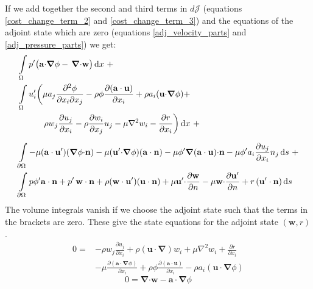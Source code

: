 \documentclass[12pt, a4paper]{article}
\begin{document}
    If we add together the second and third terms in $d \mathcal{J}$ (equations \ref{cost_change_term_2} and \ref{cost_change_term_3}) and the equations of the adjoint state which are zero (equations \ref{adj_velocity_parts} and \ref{adj_pressure_parts}) we get:
    \begin{equation} \label{cost_change_term_2345}
    \begin{split}
        &\int\limits_{\Omega} p' \big{(}
            \mathbf{a \cdot} \boldsymbol{\nabla} \phi -
            \, \boldsymbol{\nabla} \mathbf{\cdot w}
        \big{)} \, \mathrm{d}x \ + \\
        &\int\limits_{\Omega} u'_i \bigg{(}
            \mu a_j \frac{\partial^2 \phi}{\partial x_i \partial x_j}  - 
            \rho \phi \frac{\partial (\mathbf{a \cdot u})}{\partial x_i} +
            \rho a_i (\mathbf{u \cdot} \boldsymbol{\nabla} \phi) + \\
        & \phantom{\int\limits_{\Omega} u'_i \bigg{(} \ }
            \rho w_j \frac{\partial u_j}{\partial x_i} - 
            \rho \frac{\partial w_i}{\partial x_j} u_j - 
            \mu \nabla^2 w_i - 
            \frac{\partial r}{\partial x_i}
        \bigg{)} \, \mathrm{d}x \ + \\
        &\int\limits_{\partial \Omega}
            -\mu (\mathbf{a \cdot u'}) (\boldsymbol{\nabla} \phi \mathbf{\cdot n}) - 
            \mu (\mathbf{u' \cdot} \boldsymbol{\nabla} \phi) (\mathbf{a \cdot n}) - 
            \mu \phi' \boldsymbol{\nabla}(\mathbf{a \cdot u}) \mathbf{\cdot n} - 
            \mu \phi' a_i \frac{\partial u_j}{\partial x_i} n_j
        \, \mathrm{d}s \ + \\
        &\int\limits_{\partial \Omega}
            p \phi' \mathbf{a \cdot n} +
            p' \, \mathbf{w \cdot n} + 
            \rho (\mathbf{w \cdot u'}) (\mathbf{u \cdot n}) + 
            \mu \mathbf{u' \cdot} \frac{\partial \mathbf{w}}{\partial n} - 
            \mu \mathbf{w \cdot} \frac{\partial \mathbf{u'}}{\partial n} + 
            r \, (\mathbf{u' \cdot n})
        \, \mathrm{d}s
    \end{split}
    \end{equation}
    The volume integrals vanish if we choose the adjoint state such that the terms in the brackets are zero. These give the state equations for the adjoint state $(\mathbf{w}, r)$.
    \begin{equation}
    \begin{split}
        0 = & -\rho w_j \frac{\partial u_j}{\partial x_i} +
            \rho (\mathbf{u \cdot} \boldsymbol{\nabla}) w_i +
            \mu \nabla^2 w_i +
            \frac{\partial r}{\partial x_i} \\ 
        & -\mu \frac{\partial (\mathbf{a \cdot} \boldsymbol{\nabla} \phi)}{\partial x_i} +
        \rho \phi \frac{\partial (\mathbf{a \cdot u})}{\partial x_i} - 
        \rho a_i (\mathbf{u \cdot} \boldsymbol{\nabla} \phi)
    \end{split}
    \end{equation}
    \begin{equation}
        0 = \boldsymbol{\nabla} \mathbf{\cdot w} - 
        \mathbf{a \cdot} \boldsymbol{\nabla} \phi
    \end{equation}
    
\end{document}
